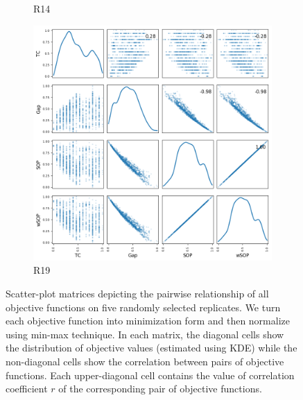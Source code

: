 \begin{figure}[!htbp]
\begin{adjustwidth}{-1cm}{-1cm}
\begin{subfigure}{0.35\textwidth}
		\caption{R14}
	\end{subfigure}
	\begin{subfigure}{0.35\textwidth}
		\includegraphics[width=\columnwidth]{Figure/NumGaps_SOP_TC_wSOP/precomputedInit/R19/fig/scatter_mattrix}
		\caption{R19}
	\end{subfigure}
	\caption{Scatter-plot matrices depicting the pairwise relationship of all objective functions on five randomly selected replicates. We turn each objective function into minimization form and then normalize using min-max technique. In each matrix, the diagonal cells show the distribution of objective values (estimated using KDE) while the non-diagonal cells show the correlation between pairs of objective functions. Each upper-diagonal cell contains the value of correlation coefficient $r$ of the corresponding pair of objective functions.}
	\label{fig:nature_obj}
	\end{adjustwidth}
\end{figure}

